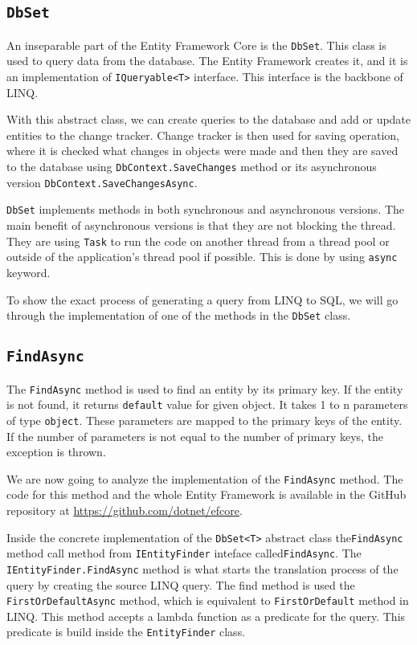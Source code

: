 \subsection {\texttt{DbSet}}

An inseparable part of the Entity Framework Core is the \texttt{DbSet}. This class is used to query data from the database.
The Entity Framework creates it, and it is an implementation of \texttt{IQueryable<T>} interface.
This interface is the backbone of LINQ.

With this abstract class, we can create queries to the database and add or update entities to the change tracker.
Change tracker is then used for saving operation, where it is checked what changes in objects were made and then they are saved to the database using \texttt{DbContext.SaveChanges} method or its asynchronous version \texttt{DbContext.SaveChangesAsync}.

\texttt{DbSet} implements methods in both synchronous and asynchronous versions.
The main benefit of asynchronous versions is that they are not blocking the thread.
They are using \texttt{Task} to run the code on another thread from a thread pool or outside of the application's thread pool if possible.
This is done by using \texttt{async} keyword.

To show the exact process of generating a query from LINQ to SQL, we will go through the implementation of one of the methods in the \texttt{DbSet} class.

\subsection{\texttt{FindAsync}}

The \texttt{FindAsync} method is used to find an entity by its primary key. If the entity is not found, it returns \texttt{default} value for given object.
It takes 1 to n parameters of type \texttt{object}. These parameters are mapped to the primary keys of the entity.
If the number of parameters is not equal to the number of primary keys, the exception is thrown.

We are now going to analyze the implementation of the \texttt{FindAsync} method. The code for this method and the whole Entity Framework is available in the GitHub repository at \url{https://github.com/dotnet/efcore}.

Inside the concrete implementation of the \texttt{DbSet<T>} abstract class the\linebreak \texttt{FindAsync} method call method from \texttt{IEntityFinder} inteface called\linebreak\texttt{FindAsync}.
The \texttt{IEntityFinder.FindAsync} method is what starts the translation process of the query by creating the source LINQ query.
The find method is used the \texttt{FirstOrDefaultAsync} method, which is equivalent to \texttt{FirstOrDefault} method in LINQ. This method accepts a lambda function as a predicate for the query.
This predicate is build inside the \texttt{EntityFinder} class.

